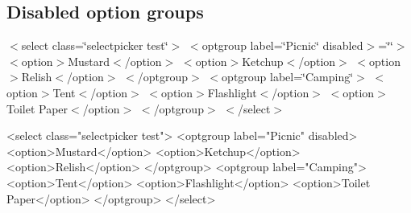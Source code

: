 \subsection*{Disabled option groups}

 $<$select class=\char`\"{}selectpicker test\char`\"{}$>$ $<$optgroup label=\char`\"{}\+Picnic\char`\"{} disabled$>$=\char`\"{}\char`\"{}$>$ $<$option$>$Mustard$<$/option$>$ $<$option$>$Ketchup$<$/option$>$ $<$option$>$Relish$<$/option$>$ $<$/optgroup$>$ $<$optgroup label=\char`\"{}\+Camping\char`\"{}$>$ $<$option$>$Tent$<$/option$>$ $<$option$>$Flashlight$<$/option$>$ $<$option$>$Toilet Paper$<$/option$>$ $<$/optgroup$>$ $<$/select$>$ 


\begin{DoxyCode}
<select class="selectpicker test">
  <optgroup label="Picnic" disabled>
    <option>Mustard</option>
    <option>Ketchup</option>
    <option>Relish</option>
  </optgroup>
  <optgroup label="Camping">
    <option>Tent</option>
    <option>Flashlight</option>
    <option>Toilet Paper</option>
  </optgroup>
</select>
\end{DoxyCode}
 